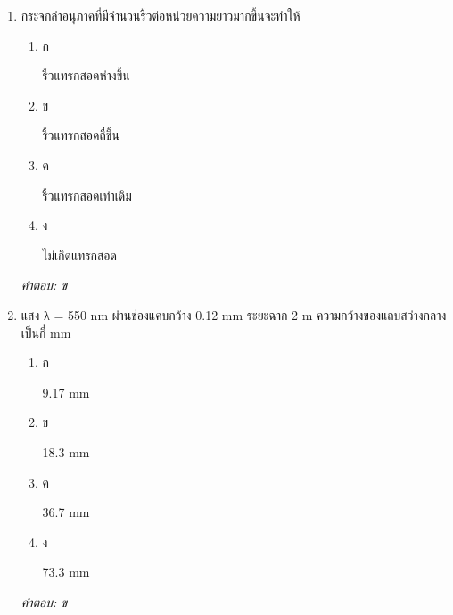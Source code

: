 \documentclass[12pt]{article}
\begin{document}
\begin{enumerate}[label=\arabic*., itemsep=0.5\baselineskip, topsep=0.5\baselineskip, leftmargin=*]
\item กระจกลำอนุภาคที่มีจำนวนริ้วต่อหน่วยความยาวมากขึ้นจะทำให้
\begin{enumerate}[label=\alph*)., itemsep=0.3\baselineskip, topsep=0.3\baselineskip]
\item ก\ 
\begin{minipage}[t]{0.9\linewidth}
\raggedright ริ้วแทรกสอดห่างขึ้น
\end{minipage}
\item ข\ 
\begin{minipage}[t]{0.9\linewidth}
\raggedright ริ้วแทรกสอดถี่ขึ้น
\end{minipage}
\item ค\ 
\begin{minipage}[t]{0.9\linewidth}
\raggedright ริ้วแทรกสอดเท่าเดิม
\end{minipage}
\item ง\ 
\begin{minipage}[t]{0.9\linewidth}
\raggedright ไม่เกิดแทรกสอด
\end{minipage}
\end{enumerate}
\vspace{-0.3\baselineskip}
\begin{small}
\textit{คำตอบ: ข}
\end{small}

\item แสง λ = 550 nm ผ่านช่องแคบกว้าง 0.12 mm ระยะฉาก 2 m ความกว้างของแถบสว่างกลางเป็นกี่ mm
\begin{enumerate}[label=\alph*)., itemsep=0.3\baselineskip, topsep=0.3\baselineskip]
\item ก\ 
\begin{minipage}[t]{0.9\linewidth}
\raggedright 9.17 mm
\end{minipage}
\item ข\ 
\begin{minipage}[t]{0.9\linewidth}
\raggedright 18.3 mm
\end{minipage}
\item ค\ 
\begin{minipage}[t]{0.9\linewidth}
\raggedright 36.7 mm
\end{minipage}
\item ง\ 
\begin{minipage}[t]{0.9\linewidth}
\raggedright 73.3 mm
\end{minipage}
\end{enumerate}
\vspace{-0.3\baselineskip}
\begin{small}
\textit{คำตอบ: ข}
\end{small}


\end{enumerate}
\end{document}
